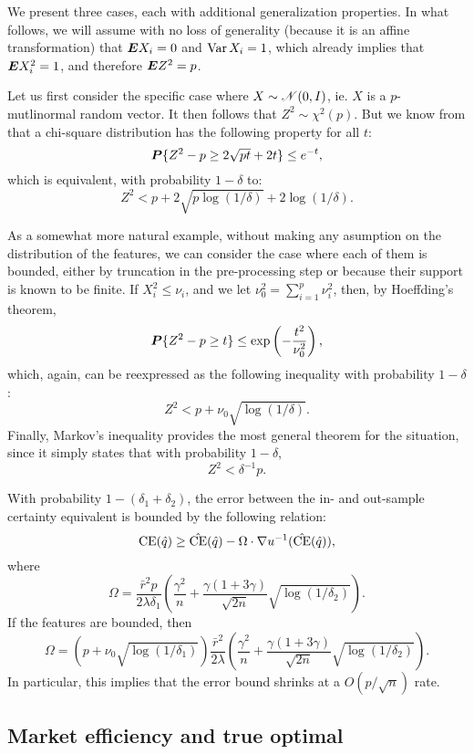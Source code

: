 We present three cases, each with additional generalization properties. In what follows,
we will assume with no loss of generality (because it is an affine transformation) that
$\bm E X_i=0$ and $\operatorname{Var} X_i = 1$, which already implies that $\bm E X_i^2=1$, and therefore
$\bm E Z^2=p$.


Let us first consider the specific case where $X\sim\mathscr{N}(0,I)$, ie. $X$ is a
$p$-mutlinormal random vector. It then follows that $Z^2\sim\chi^2(p)$. But we know from
\cite{laurent2000adaptive} that a chi-square distribution has the following property for
all $t$:
\[
\bm P\{Z^2-p \geq 2\sqrt{pt} + 2t\} \leq e^{-t},
\] 
which is equivalent, with probability $1-\delta$ to:
\[
  Z^2 < p + 2\sqrt{p\log(1/\delta)} + 2\log(1/\delta).
\]

As a somewhat more natural example, without making any asumption on the distribution of
the features, we can consider the case where each of them is bounded, either by truncation
in the pre-processing step or because their support is known to be finite. If
$X_i^2 \leq \nu_i$, and we let $\nu^2_0 = \sum_{i=1}^p \nu_i^2$, then, by Hoeffding's
theorem,
\[
  \bm P\{Z^2 - p\geq t\} \leq \exp\left(-\frac{t^2}{\nu_0^2}\right),
\]
which, again, can be reexpressed as the following inequality with probability $1-\delta$:
\[
  Z^2 < p + \nu_0\sqrt{\log(1/\delta)}.
\]
Finally, Markov's inequality provides the most general theorem for the situation, since it
simply states that with probability $1-\delta$, 
\[
  Z^2 < \delta^{-1}p.
\]
\begin{thm}
  With probability $1-(\delta_1+\delta_2)$, the error between the in- and out-sample certainty
  equivalent is bounded by the following relation:
  \[
    \operatorname{CE}(\hat q) \geq \hat{\operatorname{CE}}(\hat q) - \Omega\cdot\nabla u^{-1}(\hat{\operatorname{CE}}(\hat q)),
  \]
  where
  \[
    \Omega = \frac{\bar r^2p}{2\lambda\delta_1} \left(\frac{\gamma^2}{n} + \frac{\gamma(1+3\gamma)}{\sqrt{2n}}\sqrt{\log(1/\delta_2)}\right).
  \]
  If the features are bounded, then 
  \[
    \Omega = (p+\nu_0\sqrt{\log(1/\delta_1)})\frac{\bar r^2}{2\lambda} \left(\frac{\gamma^2}{n} + \frac{\gamma(1+3\gamma)}{\sqrt{2n}}\sqrt{\log(1/\delta_2)}\right).
  \]
In particular, this implies that the error bound shrinks at a $O(p/\sqrt{n})$ rate. 
\end{thm}

\subsection{Market efficiency and true optimal}

